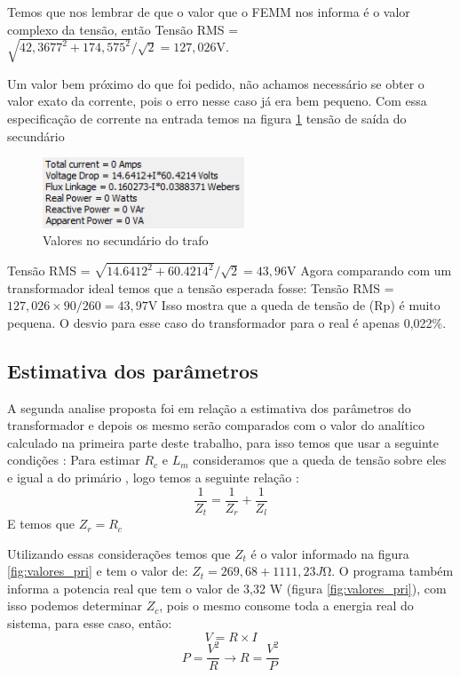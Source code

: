 \documentclass[
	12pt,				%
	openright,			%
	twoside,			%
	a4paper,			%
	english,			%
	french,				%
	spanish,			%
	brazil,				%
	]{abntex2}
\begin{document}
Temos que nos lembrar de que o valor que o FEMM nos informa é o valor complexo da tensão, então Tensão RMS = $\sqrt{42,3677^2+174,575^2}/\sqrt{2} =  127,026\mathrm{V}$.

Um valor bem próximo do que foi pedido, não achamos necessário se obter o valor exato da corrente, pois o erro nesse caso já era bem pequeno.
Com essa especificação  de corrente na entrada temos na figura \ref{fig:valores_sec}  tensão de saída do secundário 

\begin{figure}[H]
    \centering
    \includegraphics[width=6cm]{img/valores_2.png}
    \caption{Valores no secundário do trafo}
    \label{fig:valores_sec}
\end{figure}


Tensão RMS = $\sqrt{14.6412^2+60.4214^2}/\sqrt{2} =  43,96$V
Agora comparando com um transformador ideal temos que a tensão esperada fosse:
 Tensão RMS = $127,026 \times 90/260 = 43,97$V
Isso mostra que a queda de tensão de (Rp) é muito pequena. O desvio para esse caso do transformador para o real é apenas 0,022\%.

\subsection{Estimativa dos parâmetros}

A segunda analise proposta foi em relação a estimativa dos parâmetros do transformador e depois os mesmo serão comparados com o valor do analítico calculado na primeira parte deste trabalho, para isso temos que usar a seguinte condições :
Para estimar  $R_{c}$ e $L_{m}$ consideramos que a queda de tensão sobre eles e igual a do primário , logo temos a seguinte relação :
$$\frac{1}{Z_{t}} = \frac{1}{Z_{r}} + \frac{1}{Z_{l}}$$
E temos que $Z_{r} = R_{c}$

Utilizando essas considerações temos que $Z_{t}$ é o valor informado na figura  \ref{fig:valores_pri}  e tem o valor de:
$Z_{t} =  269,68+ 1111,23J\mathrm{\Omega}$.
O programa também informa a potencia real que tem o valor de 3,32 W (figura  \ref{fig:valores_pri}), com isso podemos determinar  $Z_{c}$, pois o mesmo consome toda a energia real do sistema, para esse caso, então:
$$V = R \times I$$ 
$$P = \frac{V^2}{R} \rightarrow R = \frac{V^2}{P}$$
\end{document}
